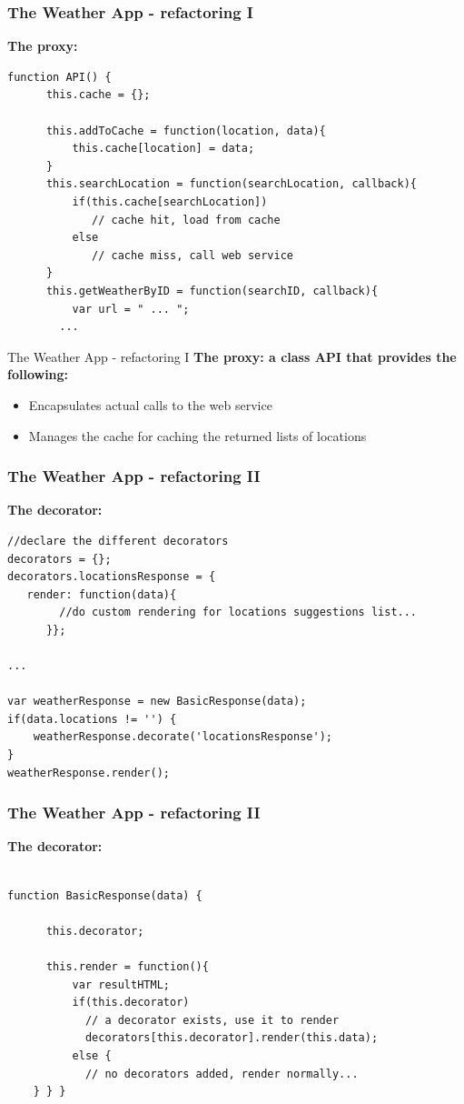 \documentclass{beamer}
\begin{document}
\begin{frame}[fragile]
\frametitle{The Weather App - refactoring I}
\textbf{The proxy:}
\begin{lstlisting}
function API() {
	  this.cache = {};
	  
	  this.addToCache = function(location, data){
		  this.cache[location] = data; 
	  }
	  this.searchLocation = function(searchLocation, callback){
		  if(this.cache[searchLocation])
		     // cache hit, load from cache
		  else
		     // cache miss, call web service
	  }
	  this.getWeatherByID = function(searchID, callback){
		  var url = " ... ";
        ...
\end{lstlisting}
\end{frame}

\begin{frame}{The Weather App - refactoring I}
\textbf{The proxy: a class API that provides the following:}
   \begin{itemize}
    \item Encapsulates actual calls to the web service
    \item Manages the cache for caching the returned lists of locations
    \end{itemize}
\end{frame}

\begin{frame}[fragile]
\frametitle{The Weather App - refactoring II}
\textbf{The decorator:}
\begin{lstlisting}
//declare the different decorators
decorators = {};
decorators.locationsResponse = {
   render: function(data){
		//do custom rendering for locations suggestions list...
	  }};
	  
...

var weatherResponse = new BasicResponse(data); 
if(data.locations != '') {
    weatherResponse.decorate('locationsResponse');
}
weatherResponse.render();

\end{lstlisting}
\end{frame}

\begin{frame}[fragile]
\frametitle{The Weather App - refactoring II}
\textbf{The decorator:}
\begin{lstlisting}

function BasicResponse(data) {

	  this.decorator;

	  this.render = function(){
		  var resultHTML;
		  if(this.decorator)
			// a decorator exists, use it to render
			decorators[this.decorator].render(this.data);
		  else {
			// no decorators added, render normally...
	} } }

\end{lstlisting}
\end{frame}
\end{document}
